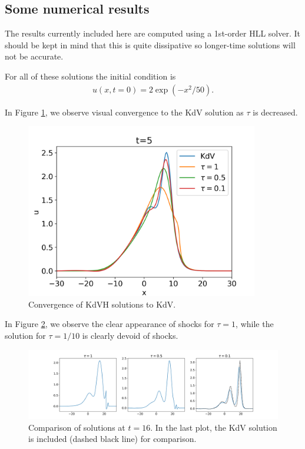 \documentclass{article}
\theoremstyle{plain}
\theoremstyle{definition}
\numberwithin{theorem}{section}
\newcommand{\todo}[1]{{\Large{\color{red}{#1}}}}
\begin{document}
\todo{TODO: Can we reverse-engineer relative energy convergence results to show well-posedness of KdV using this?}


\subsection{Some numerical results}

The results currently included here are computed using a 1st-order HLL solver.  It should be
kept in mind that this is quite dissipative so longer-time solutions will not be accurate.

For all of these solutions the initial condition is
\begin{align}
    u(x,t=0) = 2 \exp(-x^2/50).
\end{align}

In Figure \ref{fig:convergence}, we observe visual convergence to the KdV solution as
$\tau$ is decreased.

\begin{figure}
\centering
    \includegraphics[width=4in]{figures/Convergence.png}
    \caption{Convergence of KdVH solutions to KdV.\label{fig:convergence}}
\end{figure}

In Figure \ref{fig:shocks}, we observe the clear appearance of shocks for $\tau=1$, while
the solution for $\tau=1/10$ is clearly devoid of shocks.

\begin{figure}
\centering
    \includegraphics[width=6in]{figures/KdVH_solutions.png}
    \caption{Comparison of solutions at $t=16$.  In the last plot, the KdV solution is included (dashed black line)
    for comparison.\label{fig:shocks}}
\end{figure}
\end{document}
